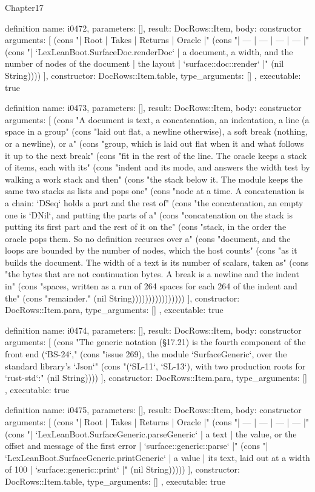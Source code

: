 \begin{lexlean}{Chapter17}
\begin{semanticmodule}
definition{
  name: i0472,
  parameters: [],
  result: DocRows::Item,
  body: constructor{
    arguments: [
      (cons "| Root | Takes | Returns | Oracle |" (cons "| --- | --- | --- | --- |" (cons "| `LexLeanBoot.SurfaceDoc.renderDoc` | a document, a width, and the number of nodes of the document | the layout | `surface::doc::render` |" (nil String))))
    ],
    constructor: DocRows::Item.table,
    type_arguments: []
  },
  executable: true
}

definition{
  name: i0473,
  parameters: [],
  result: DocRows::Item,
  body: constructor{
    arguments: [
      (cons "A document is text, a concatenation, an indentation, a line (a space in a group" (cons "laid out flat, a newline otherwise), a soft break (nothing, or a newline), or a" (cons "group, which is laid out flat when it and what follows it up to the next break" (cons "fit in the rest of the line. The oracle keeps a stack of items, each with its" (cons "indent and its mode, and answers the width test by walking a work stack and then" (cons "the stack below it. The module keeps the same two stacks as lists and pops one" (cons "node at a time. A concatenation is a chain: `DSeq` holds a part and the rest of" (cons "the concatenation, an empty one is `DNil`, and putting the parts of a" (cons "concatenation on the stack is putting its first part and the rest of it on the" (cons "stack, in the order the oracle pops them. So no definition recurses over a" (cons "document, and the loops are bounded by the number of nodes, which the host counts" (cons "as it builds the document. The width of a text is its number of scalars, taken as" (cons "the bytes that are not continuation bytes. A break is a newline and the indent in" (cons "spaces, written as a run of 264 spaces for each 264 of the indent and the" (cons "remainder." (nil String))))))))))))))))
    ],
    constructor: DocRows::Item.para,
    type_arguments: []
  },
  executable: true
}

definition{
  name: i0474,
  parameters: [],
  result: DocRows::Item,
  body: constructor{
    arguments: [
      (cons "The generic notation (§17.21) is the fourth component of the front end (`BS-24`," (cons "issue 269), the module `SurfaceGeneric`, over the standard library's `Json`" (cons "(`SL-11`, `SL-13`), with two production roots for `rust-std`:" (nil String))))
    ],
    constructor: DocRows::Item.para,
    type_arguments: []
  },
  executable: true
}

definition{
  name: i0475,
  parameters: [],
  result: DocRows::Item,
  body: constructor{
    arguments: [
      (cons "| Root | Takes | Returns | Oracle |" (cons "| --- | --- | --- | --- |" (cons "| `LexLeanBoot.SurfaceGeneric.parseGeneric` | a text | the value, or the offset and message of the first error | `surface::generic::parse` |" (cons "| `LexLeanBoot.SurfaceGeneric.printGeneric` | a value | its text, laid out at a width of 100 | `surface::generic::print` |" (nil String)))))
    ],
    constructor: DocRows::Item.table,
    type_arguments: []
  },
  executable: true
}


\end{semanticmodule}
\end{lexlean}
